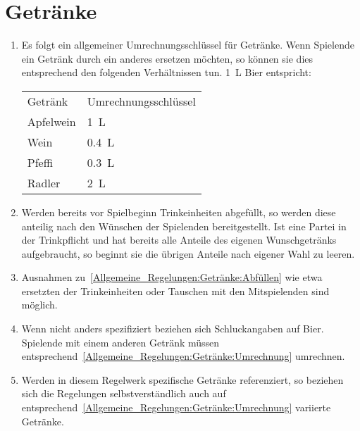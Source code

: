 \section{Getränke}\label{Allgemeine_Regelungen:Getränke}
\begin{enumerate}[label={(\arabic*)}]
	\item\label{Allgemeine_Regelungen:Getränke:Umrechnung}
	Es folgt ein allgemeiner Umrechnungsschlüssel für Getränke.
	Wenn Spielende ein Getränk durch ein anderes ersetzen möchten, so können sie dies entsprechend den folgenden Verhältnissen tun.
	\SI{1}{\liter} Bier entspricht:
	\begin{tabular}{ll}
		\toprule
		Getränk   & Umrechnungsschlüssel \\
		Apfelwein & \SI{1}{\liter} \\
		Wein 	  & \SI{0,4}{\liter} \\
		Pfeffi 	  & \SI{0,3}{\liter} \\
		Radler    & \SI{2}{\liter} \\\bottomrule
	\end{tabular}
	
	\item\label{Allgemeine_Regelungen:Getränke:Abfüllen}
	Werden bereits vor Spielbeginn Trinkeinheiten abgefüllt, so werden diese anteilig nach den Wünschen der Spielenden bereitgestellt.
	Ist eine Partei in der Trinkpflicht und hat bereits alle Anteile des eigenen Wunschgetränks aufgebraucht, so beginnt sie die übrigen Anteile nach eigener Wahl zu leeren.
	
	\item
	Ausnahmen zu~\ref{Allgemeine_Regelungen:Getränke:Abfüllen} wie etwa ersetzten der Trinkeinheiten oder Tauschen mit den Mitspielenden sind möglich.
	
	\item
	Wenn nicht anders spezifiziert beziehen sich Schluckangaben auf Bier.
	Spielende mit einem anderen Getränk müssen entsprechend~\ref{Allgemeine_Regelungen:Getränke:Umrechnung} umrechnen.

	\item
	Werden in diesem Regelwerk spezifische Getränke referenziert, so beziehen sich die Regelungen selbstverständlich auch auf entsprechend~\ref{Allgemeine_Regelungen:Getränke:Umrechnung} variierte Getränke.
\end{enumerate}
